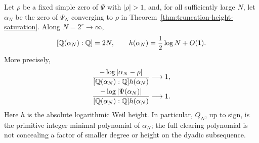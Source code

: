 \begin{theorem}
\label{thm:dyadic-minimal-height-saturation}
Let \(\rho\) be a fixed simple zero of \(\Psi\) with \(|\rho|>1\), and,
for all sufficiently large \(N\), let \(\alpha_N\) be the zero of
\(\Psi_N\) converging to \(\rho\) in
Theorem~\ref{thm:truncation-height-saturation}.  Along
\(N=2^r\to\infty\),
\begin{equation}\label{eq:dyadic-degree-height}
 [\mathbb Q(\alpha_N):\mathbb Q]=2N,
 \qquad
 h(\alpha_N)=\frac12\log N+O(1).
\end{equation}
More precisely,
\begin{align}
 \frac{-\log|\alpha_N-\rho|}
 {[\mathbb Q(\alpha_N):\mathbb Q]h(\alpha_N)}&\longrightarrow1,
 \label{eq:dyadic-root-height-ratio}\\
 \frac{-\log|\Psi(\alpha_N)|}
 {[\mathbb Q(\alpha_N):\mathbb Q]h(\alpha_N)}&\longrightarrow1.
 \label{eq:dyadic-value-height-ratio}
\end{align}
Here \(h\) is the absolute logarithmic Weil height.  In particular,
\(Q_N\), up to sign, is the primitive integer minimal polynomial of
\(\alpha_N\); the full clearing polynomial is not concealing a factor of
smaller degree or height on the dyadic subsequence.
\end{theorem}

